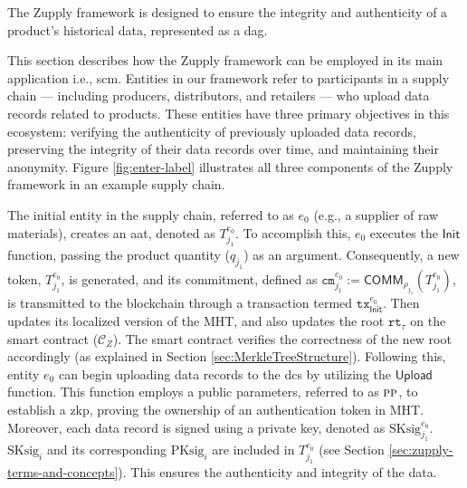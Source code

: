 The Zupply framework is designed to ensure the integrity and authenticity of a product's historical data, represented as a \gls{dag}. 

This section describes how the Zupply framework can be employed in its main application i.e., \gls{scm}. Entities in our framework refer to participants in a supply chain — including producers, distributors, and retailers — who upload data records related to products. These entities have three primary objectives in this ecosystem: verifying the authenticity of previously uploaded data records, preserving the integrity of their data records over time, and maintaining their anonymity. Figure \ref{fig:enter-label} illustrates all three components of the Zupply framework in an example supply chain.

The initial entity in the supply chain, referred to as $e_{0}$ (e.g., a supplier of raw materials), creates an \gls{aat}, denoted as $T^{e_{0}}_{j_1}$. To accomplish this, $e_{0}$ executes the $\mathsf{Init}$ function, passing the product quantity ($q_{j_1}$) as an argument. Consequently, a new token, $T^{e_{0}}_{j_1}$, is generated, and its commitment, defined as $\texttt{cm}^{e_{0}}_{j_1} := \mathsf{COMM}_{\rho_{j_1}}(T^{e_{0}}_{j_1})$, is transmitted to the blockchain through a transaction termed $\texttt{tx}^{e_{0}}_\mathsf{Init}$. Then updates its localized version of the \textsf{MHT}, and also updates the root $\texttt{rt}_\tau$ on the smart contract ($\mathcal{C}_Z$). The smart contract verifies the correctness of the new root accordingly (as explained in Section \ref{sec:MerkleTreeStructure}). Following this, entity $e_0$ can begin uploading data records to the \gls{dcs} by utilizing the $\mathsf{Upload}$ function. This function employs a public parameters, referred to as $\textsc{pp}$, to establish a \gls{zkp}, proving the ownership of an authentication token in \textsf{MHT}. Moreover, each data record is signed using a private key, denoted as \( \text{SKsig}^{e_{0}}_{{j_1}} \). $\text{SKsig}_{i}$ and its corresponding $\text{PKsig}_{i}$ are included in \( T^{e_{0}}_{j_1} \) (see Section \ref{sec:zupply-terms-and-concepts}). This ensures the authenticity and integrity of the data.



